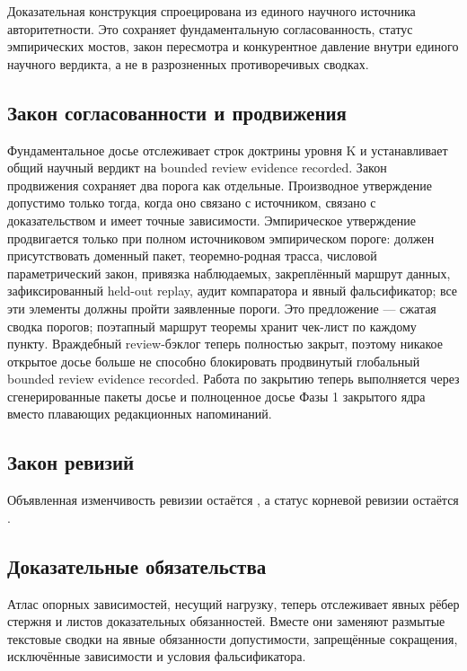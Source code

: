 Доказательная конструкция спроецирована из единого научного источника авторитетности. Это сохраняет фундаментальную согласованность, статус эмпирических мостов, закон пересмотра и конкурентное давление внутри единого научного вердикта, а не в разрозненных противоречивых сводках.

\subsection{Закон согласованности и продвижения}
Фундаментальное досье отслеживает  строк доктрины уровня K и устанавливает общий научный вердикт на bounded review evidence recorded.
Закон продвижения сохраняет два порога как отдельные. Производное утверждение допустимо только тогда, когда оно связано с источником, связано с доказательством и имеет точные зависимости. Эмпирическое утверждение продвигается только при полном источниковом эмпирическом пороге: должен присутствовать доменный пакет, теоремно-родная трасса, числовой параметрический закон, привязка наблюдаемых, закреплённый маршрут данных, зафиксированный held-out replay, аудит компаратора и явный фальсификатор; все эти элементы должны пройти заявленные пороги. Это предложение — сжатая сводка порогов; поэтапный маршрут теоремы хранит чек-лист по каждому пункту.
Враждебный review-бэклог теперь полностью закрыт, поэтому никакое открытое досье больше не способно блокировать продвинутый глобальный bounded review evidence recorded.
Работа по закрытию теперь выполняется через сгенерированные пакеты досье и полноценное досье Фазы 1 закрытого ядра вместо плавающих редакционных напоминаний.

\subsection{Закон ревизий}
Объявленная изменчивость ревизии остаётся , а статус корневой ревизии остаётся .

\subsection{Доказательные обязательства}
Атлас опорных зависимостей, несущий нагрузку, теперь отслеживает  явных рёбер стержня и  листов доказательных обязанностей. Вместе они заменяют размытые текстовые сводки на явные обязанности допустимости, запрещённые сокращения, исключённые зависимости и условия фальсификатора.

